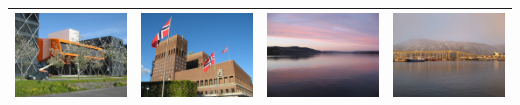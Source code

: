 \begin{small}
\begin{center}
\begin{longtable}{|c|c|c|c|}
 \hline
 \hyperref[sec:SRL]{\includegraphics[keepaspectratio,width=9em,height=6em]{NorNet-Configuration-Images/Simula_Research_Laboratory.jpeg}} & \hyperref[sec:UiO]{\includegraphics[keepaspectratio,width=9em,height=6em]{NorNet-Configuration-Images/Universitetet_i_Oslo.jpeg}} & \hyperref[sec:HiG]{\includegraphics[keepaspectratio,width=9em,height=6em]{NorNet-Configuration-Images/Hoegskolen_i_Gjoevik.jpeg}} & \hyperref[sec:UiT]{\includegraphics[keepaspectratio,width=9em,height=6em]{NorNet-Configuration-Images/Universitetet_i_Tromsoe.jpeg}} \\ \hline

\end{longtable}
\end{center}
\end{small}
